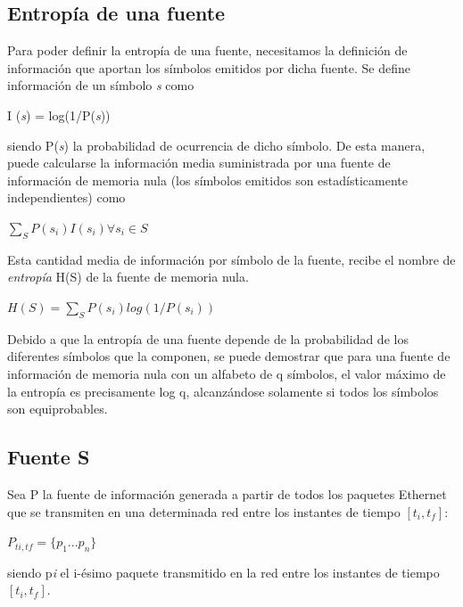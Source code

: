 \documentclass[final,inline,narroweqnarray,a4paper]{ieee}
\begin{document}
\subsection{Entropía de una fuente}
Para poder definir la entropía de una fuente, necesitamos la definición de información que aportan los símbolos emitidos por dicha fuente. Se define información de un símbolo \textit{s} como 
\begin{center}
	I (\textit{s}) = log(1/P(\textit{s})) 
\end{center}
siendo P(\textit{s}) la probabilidad de ocurrencia de dicho símbolo.
De esta manera, puede calcularse la información media suministrada por una fuente de información de memoria nula (los símbolos emitidos son estadísticamente independientes) como 

\begin{center}
$\sum_{S} P(s_{i})I(s_{i}) \forall{s_{i}} \in{S}$
\end{center}

\begin{flushleft}
	Esta cantidad media de información por símbolo de la fuente, recibe el nombre de \textit{entropía} H(S) de la fuente de memoria nula.
\end{flushleft}

\begin{center}
	$H(S) =\sum_{S} P(s_{i})log(1/P(s_{i}))$ 

\end{center}
	
Debido a que la entropía de una fuente depende de la probabilidad de los diferentes símbolos que la componen, se puede demostrar que para una fuente de información de memoria nula con un alfabeto de q símbolos, el valor máximo de la entropía es precisamente log q, alcanzándose solamente si todos los símbolos son equiprobables.


\subsection{Fuente S} \label{ssec:fuenteS}

Sea P la fuente de información generada a partir de todos los paquetes Ethernet que se transmiten en una determinada red entre los instantes de tiempo $[t_{i}, t_{f}]$:

	$P_{ti,tf} = \{p_{1}...p_{n}\}$ 

\begin{flushleft}
	siendo p{\scriptsize \textit{i}} el i-ésimo paquete transmitido en la red entre los instantes de tiempo $[t_{i},t_{f}]$.
\end{flushleft}
\end{document}
